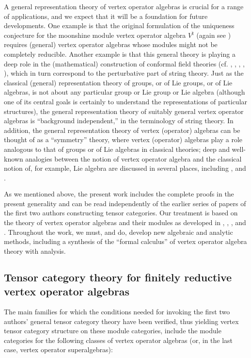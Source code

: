 \documentclass[12pt]{article}
\begin{document}
A general representation theory of vertex operator algebras is crucial
for a range of applications, and we expect that it will be a
foundation for future developments.  One example is that the original
formulation of the uniqueness conjecture \cite{FLM2} for the moonshine
module vertex operator algebra $V^{\natural}$ (again see \cite{FLM2})
requires (general) vertex operator algebras whose modules might not be
completely reducible.  Another example is that this general theory is
playing a deep role in the (mathematical) construction of conformal
field theories (cf. \cite{HPNAS}, \cite{Hconference},
\cite{HVerlindeconjecture}, \cite{rigidity}, \cite{LPNAS}), which in
turn correspond to the perturbative part of string theory.  Just as
the classical (general) representation theory of groups, or of Lie
groups, or of Lie algebras, is not about any particular group or Lie
group or Lie algebra (although one of its central goals is certainly
to understand the representations of particular structures), the
general representation theory of suitably general vertex operator
algebras is ``background independent,'' in the terminology of string
theory.  In addition, the general representation theory of vertex
(operator) algebras can be thought of as a ``symmetry'' theory, where
vertex (operator) algebras play a role analogous to that of groups or
of Lie algebras in classical theories; deep and well-known analogies
between the notion of vertex operator algebra and the classical notion
of, for example, Lie algebra are discussed in several places,
including \cite{FLM2}, \cite{FHL} and \cite{LL}.

As we mentioned above, the present work includes the complete proofs
in the present generality and can be read independently of the earlier
series of papers of the first two authors constructing tensor
categories.  Our treatment is based on the theory of vertex operator
algebras and their modules as developed in \cite{B}, \cite{FLM2},
\cite{FHL}, \cite{DL} and \cite{LL}.  Throughout the work, we must,
and do, develop new algebraic and analytic methods, including a
synthesis of the ``formal calculus'' of vertex operator algebra theory
with analysis.

\subsection{Tensor category theory for finitely reductive 
vertex operator algebras}

The main families for which the conditions needed for invoking the
first two authors' general tensor category theory have been verified,
thus yielding vertex tensor category structure \cite{tensorK} on these
module categories, include the module categories for the following
classes of vertex operator algebras (or, in the last case, vertex
operator superalgebras):
\end{document}
